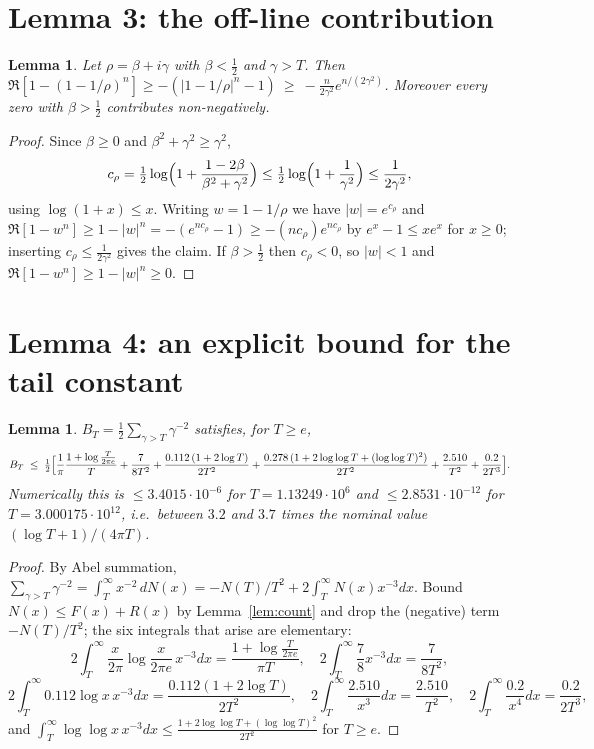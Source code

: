 \documentclass[11pt]{article}
\newtheorem{lemma}[theorem]{Lemma}
\theoremstyle{remark}
\begin{document}
\section{Lemma 3: the off-line contribution}
\begin{lemma}\label{lem:offline}
Let $\rho=\beta+i\gamma$ with $\beta<\tfrac12$ and $\gamma>T$. Then
$\Re[1-(1-1/\rho)^n]\ge-(|1-1/\rho|^{n}-1)\ \ge\ -\frac{n}{2\gamma^{2}}e^{n/(2\gamma^{2})}$.
Moreover every zero with $\beta>\tfrac12$ contributes non-negatively.
\end{lemma}
\begin{proof}
Since $\beta\ge0$ and $\beta^{2}+\gamma^{2}\ge\gamma^{2}$,
\[
  c_\rho=\tfrac12\log\Bigl(1+\frac{1-2\beta}{\beta^{2}+\gamma^{2}}\Bigr)
      \le\tfrac12\log\Bigl(1+\frac1{\gamma^{2}}\Bigr)\le\frac{1}{2\gamma^{2}},
\]
using $\log(1+x)\le x$. Writing $w=1-1/\rho$ we have $|w|=e^{c_\rho}$ and
$\Re[1-w^{n}]\ge1-|w|^{n}=-(e^{nc_\rho}-1)\ge-(n c_\rho)e^{n c_\rho}$ by $e^{x}-1\le xe^{x}$ for
$x\ge0$; inserting $c_\rho\le\frac1{2\gamma^{2}}$ gives the claim. If $\beta>\tfrac12$ then
$c_\rho<0$, so $|w|<1$ and $\Re[1-w^{n}]\ge1-|w|^{n}\ge0$.
\end{proof}

\section{Lemma 4: an explicit bound for the tail constant}
\begin{lemma}\label{lem:tail}
$B_T=\frac12\sum_{\gamma>T}\gamma^{-2}$ satisfies, for $T\ge e$,
\[
  B_T\;\le\;\tfrac12\Bigl[\frac{1}{\pi}\frac{1+\log\frac{T}{2\pi e}}{T}
       +\frac{7}{8T^{2}}+\frac{0.112\,(1+2\log T)}{2T^{2}}
       +\frac{0.278\,(1+2\log\log T+(\log\log T)^{2})}{2T^{2}}
       +\frac{2.510}{T^{2}}+\frac{0.2}{2T^{3}}\Bigr].
\]
Numerically this is $\le 3.4015\cdot10^{-6}$ for $T=1.13249\cdot10^{6}$ and
$\le 2.8531\cdot10^{-12}$ for $T=3.000175\cdot10^{12}$, i.e.\ between $3.2$ and $3.7$ times
the nominal value $(\log T+1)/(4\pi T)$.
\end{lemma}
\begin{proof}
By Abel summation, $\sum_{\gamma>T}\gamma^{-2}=\int_{T}^{\infty}x^{-2}\,dN(x)
=-N(T)/T^{2}+2\int_{T}^{\infty}N(x)x^{-3}dx$. Bound $N(x)\le F(x)+R(x)$ by Lemma~\ref{lem:count}
and drop the (negative) term $-N(T)/T^{2}$; the six integrals that arise are elementary:
\[
  2\!\int_T^\infty\!\frac{x}{2\pi}\log\frac{x}{2\pi e}\,x^{-3}dx=\frac{1+\log\frac{T}{2\pi e}}{\pi T},\quad
  2\!\int_T^\infty\!\frac78x^{-3}dx=\frac{7}{8T^{2}},
\]
\[
  2\!\int_T^\infty\!0.112\log x\,x^{-3}dx=\frac{0.112(1+2\log T)}{2T^{2}},\quad
  2\!\int_T^\infty\!\frac{2.510}{x^{3}}dx=\frac{2.510}{T^{2}},\quad
  2\!\int_T^\infty\!\frac{0.2}{x^{4}}dx=\frac{0.2}{2T^{3}},
\]
and $\int_T^\infty\log\log x\,x^{-3}dx\le\frac{1+2\log\log T+(\log\log T)^{2}}{2T^{2}}$ for
$T\ge e$.
\end{proof}
\end{document}
